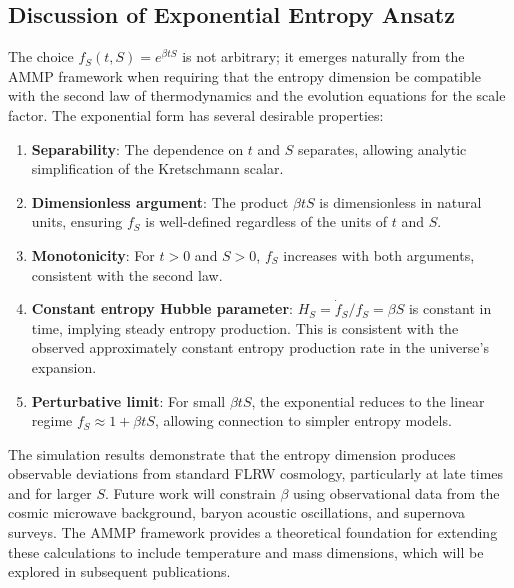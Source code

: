 \documentclass[11pt,a4paper]{article}
\begin{document}


\subsection{Discussion of Exponential Entropy Ansatz}

The choice $f_S(t,S) = e^{\beta t S}$ is not arbitrary; it emerges naturally 
from the AMMP framework \cite{Ntelis2025_AMMP} when requiring that the entropy 
dimension be compatible with the second law of thermodynamics and the 
evolution equations for the scale factor. The exponential form has several 
desirable properties:

\begin{enumerate}
    \item \textbf{Separability}: The dependence on $t$ and $S$ separates, 
          allowing analytic simplification of the Kretschmann scalar.

    \item \textbf{Dimensionless argument}: The product $\beta t S$ is 
          dimensionless in natural units, ensuring $f_S$ is well-defined 
          regardless of the units of $t$ and $S$.

    \item \textbf{Monotonicity}: For $t > 0$ and $S > 0$, $f_S$ increases 
          with both arguments, consistent with the second law.

    \item \textbf{Constant entropy Hubble parameter}: $H_S = \dot{f}_S/f_S = \beta S$ 
          is constant in time, implying steady entropy production. This is 
          consistent with the observed approximately constant entropy 
          production rate in the universe's expansion.

    \item \textbf{Perturbative limit}: For small $\beta t S$, the exponential 
          reduces to the linear regime $f_S \approx 1 + \beta t S$, allowing 
          connection to simpler entropy models.
\end{enumerate}

The simulation results demonstrate that the entropy dimension produces 
observable deviations from standard FLRW cosmology, particularly at late 
times and for larger $S$. Future work will constrain $\beta$ using 
observational data from the cosmic microwave background, baryon acoustic 
oscillations, and supernova surveys. The AMMP framework provides a 
theoretical foundation for extending these calculations to include 
temperature and mass dimensions, which will be explored in subsequent 
publications.
\end{document}
